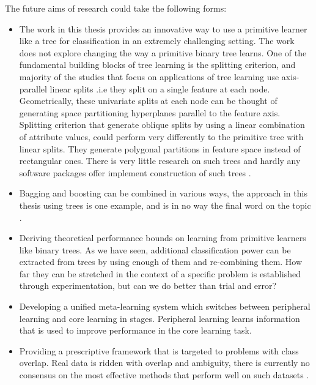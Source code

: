 The future aims of research could take the following forms:

\begin{itemize}
\item The work in this thesis provides an innovative way to use a primitive learner like a tree for classification in an extremely challenging setting. The work does not explore changing the way a primitive binary tree learns. One of the fundamental building blocks of tree learning is the splitting criterion, and majority of the studies that focus on applications of tree learning use axis-parallel linear splits .i.e they split on a single feature at each node. Geometrically, these univariate splits at each node can be thought of generating space partitioning hyperplanes parallel to the feature axis. Splitting criterion that generate oblique splits by using a linear combination of attribute values, could perform very differently to the primitive tree with linear splits. They generate polygonal partitions in feature space instead of rectangular ones.  There is very little research on such trees and hardly any software packages offer implement construction of such trees \citep{oblique}. 
\item Bagging and boosting can be combined in various ways, the approach in this thesis using trees is one example, and is in no way the final word on the topic \citep{combining, combining2}.
\item Deriving theoretical performance bounds on learning from primitive learners like binary trees. As we have seen, additional classification power can be extracted from trees by using enough of them and re-combining them. How far they can be stretched in the context of a specific problem is established through experimentation, but can we do better than trial and error? 

\item Developing a unified meta-learning system which switches between peripheral learning and core learning in stages. Peripheral learning learns information that is used to improve performance in the core learning task. 
\item Providing a prescriptive framework that is targeted to problems with class overlap. Real data is ridden with overlap and ambiguity, there is currently no consensus on the most effective methods that perform well on such datasets \citep{trappenberg,fuzzy}.
\end{itemize}
 
